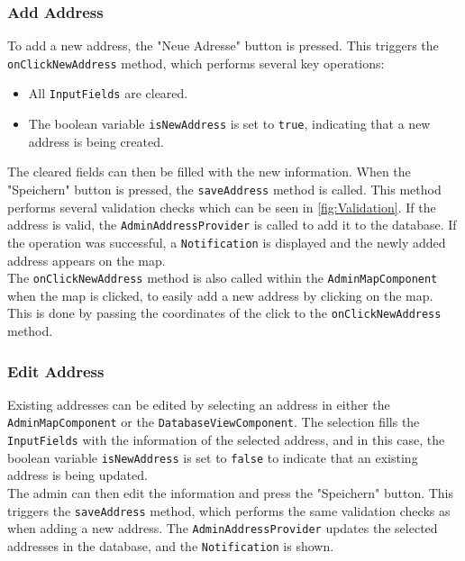 \newpage

\subsubsection{Add Address}
    \label{fig:Add Address}

    To add a new address, the "Neue Adresse" button is pressed. This triggers the \texttt{onClickNewAddress} method, which performs several key operations: 

    \begin{itemize}
        \item All \texttt{InputFields} are cleared.
        \item The boolean variable \texttt{isNewAddress} is set to \texttt{true}, indicating that a new address is being created.
    \end{itemize}

    The cleared fields can then be filled with the new information. When the "Speichern" button is pressed, the \texttt{saveAddress} method is called. This method performs several validation checks which can be seen in \ref{fig:Validation}. If the address is valid, the \texttt{AdminAddressProvider} is called to add it to the database. If the operation was successful, a \texttt{Notification} is displayed and the newly added address appears on the map.\\

    The \texttt{onClickNewAddress} method is also called within the \texttt{AdminMapComponent} when the map is clicked, to easily add a new address by clicking on the map. This is done by passing the coordinates of the click to the \texttt{onClickNewAddress} method.



\subsubsection{Edit Address}
\sloppy %
Existing addresses can be edited by selecting an address in either the \texttt{AdminMapComponent} or the \texttt{DatabaseViewComponent}.
The selection fills the \texttt{InputFields} with the information of the selected address, and in this case, the boolean variable \texttt{isNewAddress} is set to \texttt{false} to indicate that an existing address is being updated.\\

\sloppy
The admin can then edit the information and press the "Speichern" button. This triggers the \texttt{saveAddress} method, which performs the same validation checks as when adding a new address. The \texttt{AdminAddressProvider} updates the selected addresses in the database, and the \texttt{Notification} is shown.


